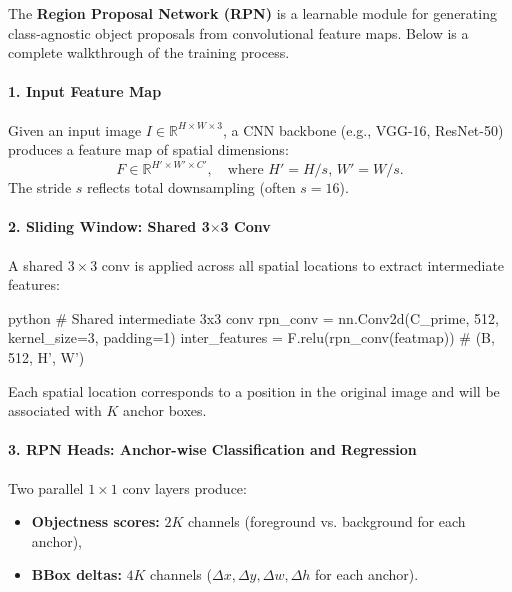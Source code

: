 \begin{enrichment}
    \label{enrichment:rpn_training_pipeline}
    
    \noindent
    The \textbf{Region Proposal Network (RPN)} \cite{ren2015_fasterrcnn} is a learnable module for generating class-agnostic object proposals from convolutional feature maps. Below is a complete walkthrough of the training process.
    
    \paragraph{1. Input Feature Map}
    Given an input image \( I \in \mathbb{R}^{H \times W \times 3} \), a CNN backbone (e.g., VGG-16, ResNet-50) produces a feature map of spatial dimensions:
    \[
    F \in \mathbb{R}^{H' \times W' \times C'}, \quad \text{where } H' = H/s,\, W' = W/s.
    \]
    The stride \( s \) reflects total downsampling (often \( s = 16 \)).
    
    \paragraph{2. Sliding Window: Shared 3\(\times\)3 Conv}
    A shared \(3 \times 3\) conv is applied across all spatial locations to extract intermediate features:
    
    \begin{mintedbox}{python}
        # Shared intermediate 3x3 conv
        rpn_conv = nn.Conv2d(C_prime, 512, kernel_size=3, padding=1)
        inter_features = F.relu(rpn_conv(featmap))  # (B, 512, H', W')
    \end{mintedbox}
    
    Each spatial location corresponds to a position in the original image and will be associated with \(K\) anchor boxes.
    
    \paragraph{3. RPN Heads: Anchor-wise Classification and Regression}
    Two parallel \(1\times1\) conv layers produce:
    \begin{itemize}
        \item \textbf{Objectness scores:} \(2K\) channels (foreground vs. background for each anchor),
        \item \textbf{BBox deltas:} \(4K\) channels (\(\Delta x, \Delta y, \Delta w, \Delta h\) for each anchor).
    \end{itemize}
    

\end{enrichment}
